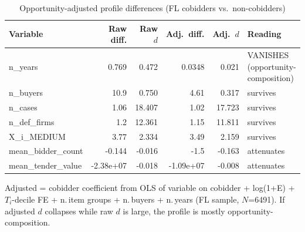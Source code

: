 \begin{table}[htbp]\centering\footnotesize
\caption{Opportunity-adjusted profile differences (FL cobidders vs.\ non-cobidders)}
\label{tab:opp_adjusted_profile}
\begin{tabular}{lrrrrl}\hline
Variable & Raw diff. & Raw $d$ & Adj.\ diff. & Adj.\ $d$ & Reading \\\hline
n\_years & 0.769 & 0.472 & 0.0348 & 0.021 & VANISHES (opportunity-composition) \\
n\_buyers & 10.9 & 0.750 & 4.61 & 0.317 & survives \\
n\_cases & 1.06 & 18.407 & 1.02 & 17.723 & survives \\
n\_def\_firms & 1.2 & 12.361 & 1.15 & 11.811 & survives \\
X\_i\_MEDIUM & 3.77 & 2.334 & 3.49 & 2.159 & survives \\
mean\_bidder\_count & -0.144 & -0.016 & -1.5 & -0.163 & attenuates \\
mean\_tender\_value & -2.38e+07 & -0.018 & -1.09e+07 & -0.008 & attenuates \\
\hline\end{tabular}
\begin{tablenotes}\footnotesize\item Adjusted = cobidder coefficient from OLS of variable on cobidder + log(1+E) + $T_i$-decile FE + n.\,item groups + n.\,buyers + n.\,years (FL sample, $N$=6491). If adjusted $d$ collapses while raw $d$ is large, the profile is mostly opportunity-composition.\end{tablenotes}
\end{table}
